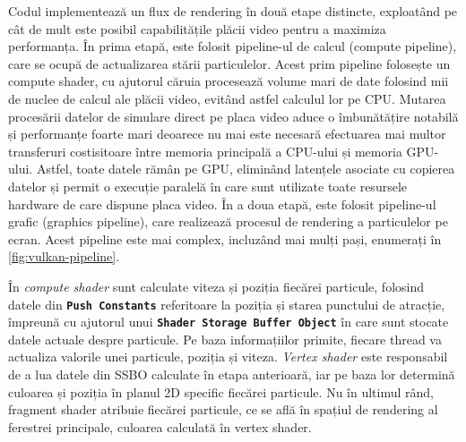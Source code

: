 Codul implementează un flux de rendering în două etape distincte, exploatând pe cât de mult este posibil capabilitățile plăcii video pentru a maximiza performanța. În prima etapă, este folosit pipeline-ul de calcul (compute pipeline), care se ocupă de actualizarea stării particulelor. Acest prim pipeline folosește un compute shader, cu ajutorul căruia procesează volume mari de date folosind mii de nuclee de calcul ale plăcii video, evitând astfel calculul lor pe CPU. Mutarea procesării datelor de simulare direct pe placa video aduce o îmbunătățire notabilă și performanțe foarte mari deoarece nu mai este necesară efectuarea mai multor transferuri costisitoare între memoria principală a CPU-ului și memoria GPU-ului. Astfel, toate datele rămân pe GPU, eliminând latențele asociate cu copierea datelor și permit o execuție paralelă în care sunt utilizate toate resursele hardware de care dispune placa video. În a doua etapă, este folosit pipeline-ul grafic (graphics pipeline), care realizează procesul de rendering a particulelor pe ecran. Acest pipeline este mai complex, incluzând mai mulți pași, enumerați în \autoref{fig:vulkan-pipeline}. 

În \textit{compute shader} sunt calculate viteza și poziția fiecărei particule, folosind datele din \textbf{\texttt{Push Constants}} referitoare la poziția și starea punctului de atracție, împreună cu ajutorul unui \textbf{\texttt{Shader Storage Buffer Object}} în care sunt stocate datele actuale despre particule. Pe baza informațiilor primite, fiecare thread va actualiza valorile unei particule, poziția și viteza. \textit{Vertex shader} este responsabil de a lua datele din SSBO calculate în etapa anterioară, iar pe baza lor determină culoarea și poziția în planul 2D specific fiecărei particule. Nu în ultimul rând, fragment shader atribuie fiecărei particule, ce se află în spațiul de rendering al ferestrei principale, culoarea calculată în vertex shader. 





